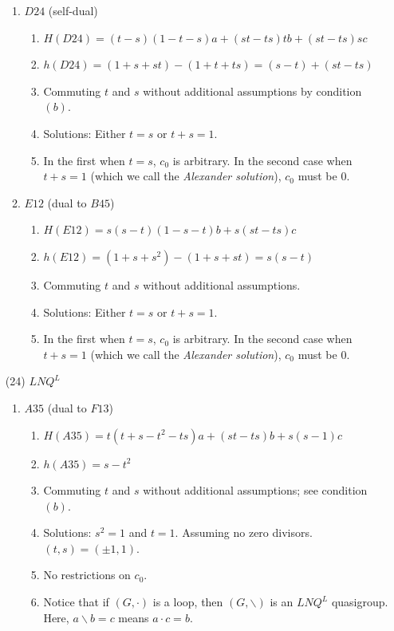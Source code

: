 \documentclass[11pt]{amsart}
\theoremstyle{definition}
\begin{document}
\begin{enumerate}
\begin{enumerate}
             \item $D24$ (self-dual)
            \begin{enumerate}
                \item  $H(D24)= (t-s)(1-t-s)a + (st-ts)tb + (st-ts)sc$
                \item   $h(D24)=(1+s+st)-(1+t+ts)=(s-t)+ (st-ts)$
                \item Commuting $t$ and $s$ without additional assumptions by condition $(b)$.
                \item Solutions: Either $t=s$ or $t+s=1$. 
                \item In the first when $t = s$, $c_0$ is arbitrary. In the second case when $t + s = 1$ (which we call the {\it Alexander solution}), $c_0$ must be $0$.
            \end{enumerate}

        \item $E12$ (dual to $B45$)
            \begin{enumerate}
                \item $H(E12) = s(s - t)(1 - s - t)b + s(st - ts)c$
                \item $h(E12) = (1 + s + s^2) - (1 + s + st) = s(s - t)$ 
                \item Commuting $t$ and $s$ without additional assumptions.
                \item Solutions: Either $t=s$ or $t+s=1$. 
                \item In the first when $t = s$, $c_0$ is arbitrary. In the second case when $t + s = 1$ (which we call the {\it Alexander solution}), $c_0$ must be $0$. 
            \end{enumerate}
        \end{enumerate}

    \item[(24)] $LNQ^L$
        \begin{enumerate}
            \item $A35$ (dual to $F13$)
            \begin{enumerate}
                \item    $H(A35) = t(t+s-t^2-ts)a+(st-ts)b+s(s-1)c$
                \item   $h(A35) = s-t^2$
                \item Commuting $t$ and $s$ without additional assumptions; see condition $(b)$.
                \item Solutions: $s^2=1$ and $t=1$. Assuming no zero divisors.  $(t,s) = (\pm 1, 1)$.
                \item No restrictions on $c_0$.
                \item Notice that if $(G, \cdot)$ is a loop, then $(G,\backslash)$ is an $LNQ^L$ quasigroup. Here, $a \backslash b = c$ means $a \cdot c = b$.
            \end{enumerate}
        \end{enumerate}    


\end{enumerate}
\end{document}
